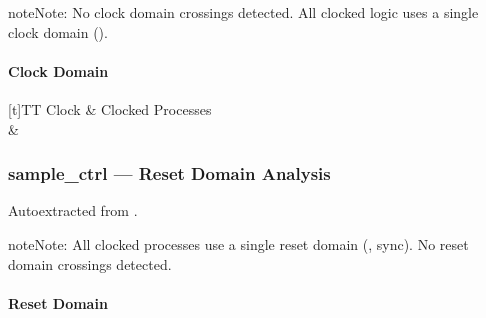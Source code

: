 \documentclass[letterpaper,10pt,english]{sphinxmanual}
\begin{document}
\begin{sphinxadmonition}{note}{Note:}
\sphinxAtStartPar
No clock domain crossings detected. All clocked logic uses a single clock domain ().
\end{sphinxadmonition}


\paragraph{Clock Domain}
\label{\detokenize{modules/sample_ctrl/cdc:clock-domain}}

\begin{savenotes}\sphinxattablestart
\sphinxthistablewithglobalstyle
\centering
\begin{tabulary}{\linewidth}[t]{TT}
\sphinxtoprule
\sphinxstyletheadfamily 
\sphinxAtStartPar
Clock
&\sphinxstyletheadfamily 
\sphinxAtStartPar
Clocked Processes
\\
\sphinxmidrule
\sphinxtableatstartofbodyhook
\sphinxAtStartPar
{}
&
\sphinxAtStartPar
{}
\\
\sphinxbottomrule
\end{tabulary}
\sphinxtableafterendhook\par
\sphinxattableend\end{savenotes}

\sphinxstepscope


\subsubsection{sample\_ctrl — Reset Domain Analysis}
\label{\detokenize{modules/sample_ctrl/reset:sample-ctrl-reset-domain-analysis}}\label{\detokenize{modules/sample_ctrl/reset::doc}}
\sphinxAtStartPar
Auto\sphinxhyphen{}extracted from .

\begin{sphinxadmonition}{note}{Note:}
\sphinxAtStartPar
All clocked processes use a single reset domain (, sync). No reset domain crossings detected.
\end{sphinxadmonition}


\paragraph{Reset Domain}
\label{\detokenize{modules/sample_ctrl/reset:reset-domain}}
\end{document}
